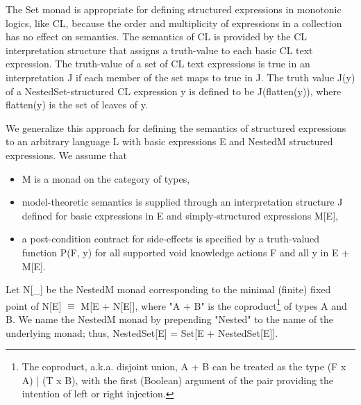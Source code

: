 \documentclass[runningheads]{llncs}
\begin{document}
The Set monad is appropriate for defining structured expressions in monotonic logics, like CL, because the order and multiplicity of expressions in a collection has no effect on semantics. The semantics of CL is provided by the CL interpretation structure that assigns a truth-value to each basic CL text expression. The truth-value of a set of CL text expressions is true in an interpretation J if each member of the set maps to true in J. The truth value J(y) of a NestedSet-structured CL expression y is defined to be J(flatten(y)), where flatten(y) is the set of leaves of y.

We generalize this approach for defining the semantics of structured expressions to an arbitrary language L with basic expressions E and NestedM structured expressions. We assume that 
\begin{itemize}
\item M is a monad on the category of types,
\item model-theoretic semantics is supplied through an interpretation structure J defined for basic expressions in E and simply-structured expressions M[E],
\item a post-condition contract for side-effects is specified by a truth-valued function P(F, y) for all supported void knowledge actions F and all y in E + M[E].
\end{itemize}

Let N[\_] be the NestedM monad corresponding to the minimal (finite) fixed point of N[E] $\equiv$ M[E + N[E]], where "A + B" is the coproduct\footnote{The coproduct, a.k.a. disjoint union, A + B can be treated as the type (F x A) | (T x B), with the first (Boolean) argument of the pair providing the intention of left or right injection.} of types A and B.
We name the NestedM monad by prepending "Nested" to the name of the underlying monad; thus, NestedSet[E] = Set[E + NestedSet[E]].
\end{document}
